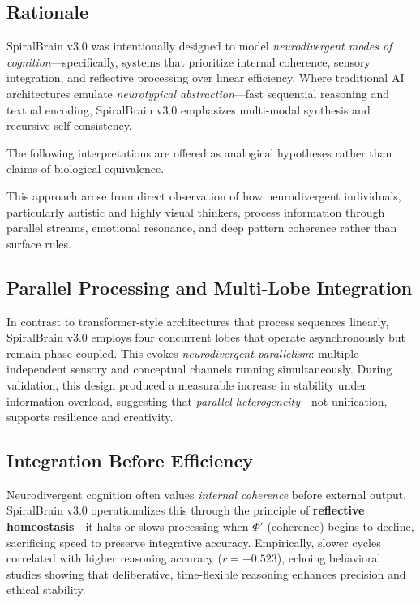 \documentclass[11pt,a4paper]{article}
\begin{document}
\subsection{Rationale}

SpiralBrain v3.0 was intentionally designed to model \textit{neurodivergent modes of cognition}---specifically, systems that prioritize internal coherence, sensory integration, and reflective processing over linear efficiency.
Where traditional AI architectures emulate \textit{neurotypical abstraction}---fast sequential reasoning and textual encoding, SpiralBrain v3.0 emphasizes multi-modal synthesis and recursive self-consistency.

The following interpretations are offered as analogical hypotheses rather than claims of biological equivalence.

This approach arose from direct observation of how neurodivergent individuals, particularly autistic and highly visual thinkers, process information through parallel streams, emotional resonance, and deep pattern coherence rather than surface rules.

\subsection{Parallel Processing and Multi-Lobe Integration}

In contrast to transformer-style architectures that process sequences linearly, SpiralBrain v3.0 employs four concurrent lobes that operate asynchronously but remain phase-coupled.
This evokes \textit{neurodivergent parallelism}: multiple independent sensory and conceptual channels running simultaneously.
During validation, this design produced a measurable increase in stability under information overload, suggesting that \textit{parallel heterogeneity}---not unification, supports resilience and creativity.

\subsection{Integration Before Efficiency}

Neurodivergent cognition often values \textit{internal coherence} before external output.
SpiralBrain v3.0 operationalizes this through the principle of \textbf{reflective homeostasis}---it halts or slows processing when $\Phi'$ (coherence) begins to decline, sacrificing speed to preserve integrative accuracy.
Empirically, slower cycles correlated with higher reasoning accuracy ($r = -0.523$), echoing behavioral studies showing that deliberative, time-flexible reasoning enhances precision and ethical stability.
\end{document}
